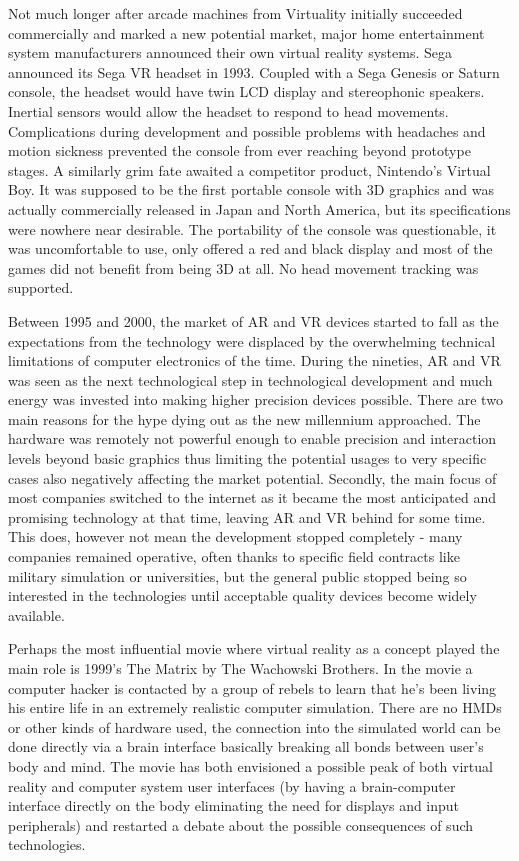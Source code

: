 \documentclass[12pt, a4paper]{article}
\begin{document}
Not much longer after arcade machines from Virtuality initially succeeded commercially and marked a new potential market, major home entertainment system manufacturers announced their own virtual reality systems. Sega announced its Sega VR headset in 1993. Coupled with a Sega Genesis or Saturn console, the headset would have twin LCD display and stereophonic speakers. Inertial sensors would allow the headset to respond to head movements. Complications during development and possible problems with headaches and motion sickness prevented the console from ever reaching beyond prototype stages. A similarly grim fate awaited a competitor product, Nintendo’s Virtual Boy. It was supposed to be the first portable console with 3D graphics and was actually commercially released in Japan and North America, but its specifications were nowhere near desirable. The portability of the console was questionable, it was uncomfortable to use, only offered a red and black display and most of the games did not benefit from being 3D at all. No head movement tracking was supported.

Between 1995 and 2000, the market of AR and VR devices started to fall as the expectations from the technology were displaced by the overwhelming technical limitations of computer electronics of the time. During the nineties, AR and VR was seen as the next technological step in technological development and much energy was invested into making higher precision devices possible. There are two main reasons for the hype dying out as the new millennium approached. The hardware was remotely not powerful enough to enable precision and interaction levels beyond basic graphics thus limiting the potential usages to very specific cases also negatively affecting the market potential. Secondly, the main focus of most companies switched to the internet as it became the most anticipated and promising technology at that time, leaving AR and VR behind for some time. This does, however not mean the development stopped completely - many companies remained operative, often thanks to specific field contracts like military simulation or universities, but the general public stopped being so interested in the technologies until acceptable quality devices become widely available.

Perhaps the most influential movie where virtual reality as a concept played the main role is 1999’s The Matrix by The Wachowski Brothers. In the movie a computer hacker is contacted by a group of rebels to learn that he’s been living his entire life in an extremely realistic computer simulation. There are no HMDs or other kinds of hardware used, the connection into the simulated world can be done directly via a brain interface basically breaking all bonds between user’s body and mind. The movie has both envisioned a possible peak of both virtual reality and computer system user interfaces (by having a brain-computer interface directly on the body eliminating the need for displays and input peripherals) and restarted a debate about the possible consequences of such technologies.
\end{document}

